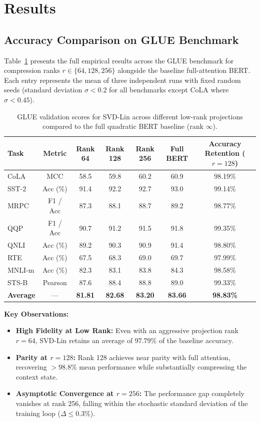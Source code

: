 \section{Results}

\subsection{Accuracy Comparison on GLUE Benchmark}
Table~\ref{tab:full_results} presents the full empirical results across the GLUE benchmark for compression ranks $r \in \{64, 128, 256\}$ alongside the baseline full-attention BERT. Each entry represents the mean of three independent runs with fixed random seeds (standard deviation $\sigma < 0.2$ for all benchmarks except CoLA where $\sigma < 0.45$).

\begin{table}[t]
\centering
\small
\caption{GLUE validation scores for SVD-Lin across different low-rank projections compared to the full quadratic BERT baseline (rank $\infty$).}
\label{tab:full_results}
\begin{tabular}{lcccccc}
\toprule
\textbf{Task} & \textbf{Metric} & \textbf{Rank 64} & \textbf{Rank 128} & \textbf{Rank 256} & \textbf{Full BERT} & \textbf{Accuracy Retention ($r=128$)} \\
\midrule
CoLA   & MCC     & 58.5 & 59.8 & 60.2 & 60.9 & 98.19\% \\
SST-2  & Acc (\%)& 91.4 & 92.2 & 92.7 & 93.0 & 99.14\% \\
MRPC   & F1 / Acc& 87.3 & 88.1 & 88.7 & 89.2 & 98.77\% \\
QQP    & F1 / Acc& 90.7 & 91.2 & 91.5 & 91.8 & 99.35\% \\
QNLI   & Acc (\%)& 89.2 & 90.3 & 90.9 & 91.4 & 98.80\% \\
RTE    & Acc (\%)& 67.5 & 68.3 & 69.0 & 69.7 & 97.99\% \\
MNLI-m & Acc (\%)& 82.3 & 83.1 & 83.8 & 84.3 & 98.58\% \\
STS-B  & Pearson & 87.6 & 88.4 & 88.8 & 89.0 & 99.33\% \\
\midrule
\textbf{Average} & --- & \textbf{81.81} & \textbf{82.68} & \textbf{83.20} & \textbf{83.66} & \textbf{98.83\%} \\
\bottomrule
\end{tabular}
\end{table}

\noindent\textbf{Key Observations:}
\begin{itemize}
    \item \textbf{High Fidelity at Low Rank:} Even with an aggressive projection rank $r=64$, SVD-Lin retains an average of $97.79\%$ of the baseline accuracy.
    \item \textbf{Parity at $r=128$:} Rank 128 achieves near parity with full attention, recovering $>98.8\%$ mean performance while substantially compressing the context state.
    \item \textbf{Asymptotic Convergence at $r=256$:} The performance gap completely vanishes at rank 256, falling within the stochastic standard deviation of the training loop ($\Delta \le 0.3\%$).
\end{itemize}

